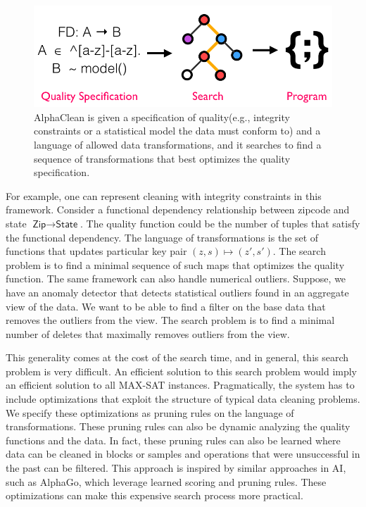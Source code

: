 \begin{figure}
\includegraphics[width=\columnwidth]{figures/intro.png}
\caption{AlphaClean  is  given  a  specification  of  quality(e.g.,  integrity  constraints  or  a  statistical  model  the  data must conform to) and a language of allowed data transformations,  and it searches to find a sequence of transformations that best optimizes the quality specification.  }
\end{figure}

For example, one can represent cleaning with integrity constraints in this framework.
Consider a functional dependency relationship between zipcode and state $\textsf{Zip} \rightarrow \textsf{State}$. The quality function could be the number of tuples that satisfy the functional dependency.
The language of transformations is the set of functions that updates particular key pair $(z,s) \mapsto (z',s')$.
The search problem is to find a minimal sequence of such maps that optimizes the quality function.
The same framework can also handle numerical outliers.
Suppose, we have an anomaly detector that detects statistical outliers found in an aggregate view of the data.
We want to be able to find a filter on the base data that removes 
the outliers from the view.
The search problem is to find a minimal number of deletes that maximally removes outliers from the view.

This generality comes at the cost of the search time, and in general, this search problem is very difficult.
An efficient solution to this search problem would imply an efficient solution to all MAX-SAT instances.
Pragmatically, the system has to include optimizations that exploit the structure of typical data cleaning problems.
We specify these optimizations as pruning rules on the language of transformations.
These pruning rules can also be dynamic analyzing the quality functions and the data.
In fact, these pruning rules can also be learned where data can be cleaned in blocks or samples and operations that were unsuccessful in the past can be filtered.
This approach is inspired by similar approaches in AI, such as AlphaGo, which leverage learned scoring and pruning rules.
These optimizations can make this expensive search process more practical.

